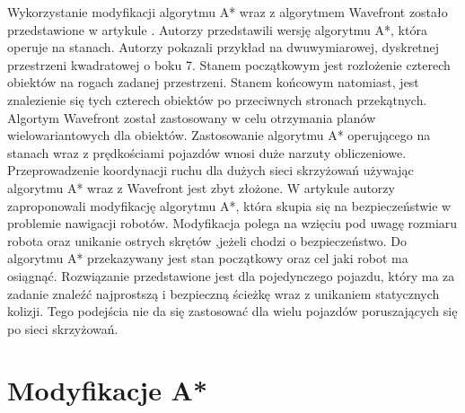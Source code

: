 \newline
\indent
Wykorzystanie modyfikacji algorytmu A* wraz z algorytmem Wavefront zostało przedstawione w artykule \cite{wojnicki2015robust}. Autorzy przedstawili wersję algorytmu A*, która operuje na stanach. Autorzy pokazali przykład na dwuwymiarowej, dyskretnej przestrzeni kwadratowej o boku 7. Stanem początkowym jest rozłożenie czterech obiektów na rogach zadanej przestrzeni. Stanem końcowym natomiast, jest znalezienie się tych czterech obiektów po przeciwnych stronach przekątnych. Algortym Wavefront został zastosowany w celu otrzymania planów wielowariantowych dla obiektów. Zastosowanie algorytmu A* operującego na stanach wraz z prędkościami pojazdów wnosi duże narzuty obliczeniowe. Przeprowadzenie koordynacji ruchu dla dużych sieci skrzyżowań używając algorytmu A* wraz z Wavefront jest zbyt złożone.
\newline
\indent
W artykule \cite{elhalawany2013modified} autorzy zaproponowali modyfikację algorytmu A*, która skupia się na bezpieczeństwie w problemie nawigacji robotów. Modyfikacja polega na wzięciu pod uwagę rozmiaru robota oraz unikanie ostrych skrętów ,jeżeli chodzi o bezpieczeństwo. Do algorytmu A* przekazywany jest stan początkowy oraz cel jaki robot ma osiągnąć. Rozwiązanie przedstawione jest dla pojedynczego pojazdu, który ma za zadanie znaleźć najprostszą i bezpieczną ścieżkę wraz z unikaniem statycznych kolizji. Tego podejścia nie da się zastosować dla wielu pojazdów poruszających się po sieci skrzyżowań.

\section{Modyfikacje A*}

